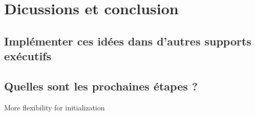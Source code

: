 
\section{Dicussions et conclusion}
\subsection{Implémenter ces idées dans d'autres supports exécutifs}

\subsection{Quelles sont les prochaines étapes ?}
More flexibility for initialization

